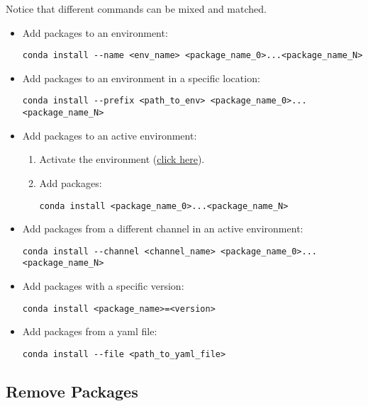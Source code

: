 Notice that different commands can be mixed and matched.
\begin{itemize}
    \item Add packages to an environment:
    \begin{verbatim}
conda install --name <env_name> <package_name_0>...<package_name_N>
    \end{verbatim}
    \item Add packages to an environment in a specific location:
    \begin{verbatim}
conda install --prefix <path_to_env> <package_name_0>...<package_name_N>
    \end{verbatim}
    \item Add packages to an active environment:
    \begin{enumerate}
        \item Activate the environment (\hyperref[conda:activateEnv]{click here}).
        \item Add packages: 
        \begin{verbatim}
conda install <package_name_0>...<package_name_N>
        \end{verbatim}
    \end{enumerate}
    \item Add packages from a different channel in an active environment:
    \begin{verbatim}
conda install --channel <channel_name> <package_name_0>...<package_name_N>
    \end{verbatim}
    \item Add packages with a specific version:
    \begin{verbatim}
conda install <package_name>=<version>
    \end{verbatim}
    \item Add packages from a yaml file:
    \begin{verbatim}
conda install --file <path_to_yaml_file>
    \end{verbatim}
\end{itemize}



\subsection{Remove Packages}

